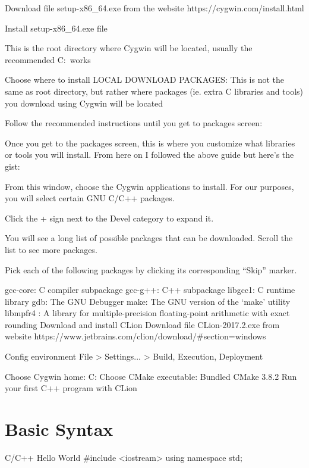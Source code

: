 Download file setup-x86_64.exe from the website https://cygwin.com/install.html

Install setup-x86_64.exe file



This is the root directory where Cygwin will be located, usually the recommended C:\ works



Choose where to install LOCAL DOWNLOAD PACKAGES: This is not the same as root directory, but rather where packages (ie. extra C libraries and tools) you download using Cygwin will be located



Follow the recommended instructions until you get to packages screen:



Once you get to the packages screen, this is where you customize what libraries or tools you will install. From here on I followed the above guide but here’s the gist:

From this window, choose the Cygwin applications to install. For our purposes, you will select certain GNU C/C++ packages.

Click the + sign next to the Devel category to expand it.

You will see a long list of possible packages that can be downloaded. Scroll the list to see more packages.

Pick each of the following packages by clicking its corresponding “Skip” marker.

gcc-core: C compiler subpackage
gcc-g++: C++ subpackage
libgcc1: C runtime library
gdb: The GNU Debugger
make: The GNU version of the ‘make’ utility
libmpfr4 : A library for multiple-precision floating-point arithmetic with exact rounding
Download and install CLion
Download file CLion-2017.2.exe from website https://www.jetbrains.com/clion/download/#section=windows



Config environment File > Settings... > Build, Execution, Deployment

Choose Cygwin home: C:
Choose CMake executable: Bundled CMake 3.8.2
Run your first C++ program with CLion

\section{Basic Syntax}

C/C++
Hello World
#include <iostream>
using namespace std;

